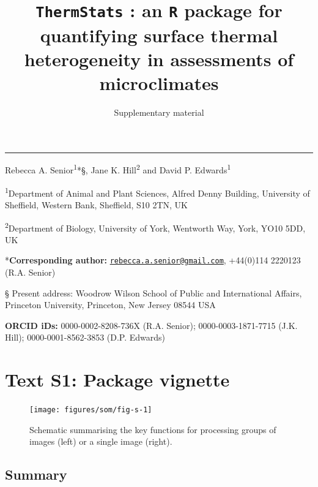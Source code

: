 \documentclass[12pt,british,a4paper,]{article}
\title{\texttt{ThermStats} : an \texttt{R} package for quantifying surface thermal heterogeneity in assessments of microclimates}
\subtitle{Supplementary material}
\author{}
\date{}
\newcommand{\beginsupplement}{\setcounter{table}{0}  \renewcommand{\tablename}{Supplementary Table} \setcounter{figure}{0} \renewcommand{\figurename}{Supplementary Figure}}
\begin{document}
\maketitle

\begin{center}\rule{0.5\linewidth}{\linethickness}\end{center}

Rebecca A. Senior\textsuperscript{1}*§, Jane K. Hill\textsuperscript{2} and David P. Edwards\textsuperscript{1}

\textsuperscript{1}Department of Animal and Plant Sciences, Alfred Denny Building, University of Sheffield, Western Bank, Sheffield, S10 2TN, UK

\textsuperscript{2}Department of Biology, University of York, Wentworth Way, York, YO10 5DD, UK

*\textbf{Corresponding author:} \href{mailto:rebecca.a.senior@gmail.com}{\nolinkurl{rebecca.a.senior@gmail.com}}, +44(0)114 2220123 (R.A. Senior)

§ Present address: Woodrow Wilson School of Public and International Affairs, Princeton University, Princeton, New Jersey 08544 USA

\textbf{ORCID iDs:} 0000-0002-8208-736X (R.A. Senior); 0000-0003-1871-7715 (J.K. Hill); 0000-0001-8562-3853 (D.P. Edwards)

\pagebreak
\raggedright
\setcounter{tocdepth}{2}
\tableofcontents
\pagebreak
\beginsupplement

\hypertarget{text-s1-package-vignette}{%
\section{Text S1: Package vignette}\label{text-s1-package-vignette}}



\begin{figure}[H]

{\centering \texttt{[image: figures/som/fig-s-1]} 

}

\caption{Schematic summarising the key functions for processing groups of images (left) or a single image (right).}\label{fig:fig-2}
\end{figure}

\hypertarget{summary}{%
\subsection{Summary}\label{summary}}
\end{document}
